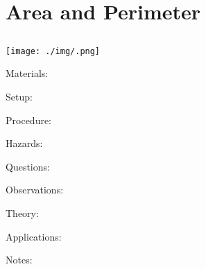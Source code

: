 \section{Area and Perimeter}

\begin{multicols}{2}


\section*{}


\subsection{}

\begin{center}
\texttt{[image: ./img/.png]}
\end{center}

\begin{description*}
\item[Materials:]{}
\item[Setup:]{}
\item[Procedure:]{}
\item[Hazards:]{}
\item[Questions:]{}
\item[Observations:]{}
\item[Theory:]{}
\item[Applications:]{}
\item[Notes:]{}
\end{description*}



\end{multicols}

\pagebreak